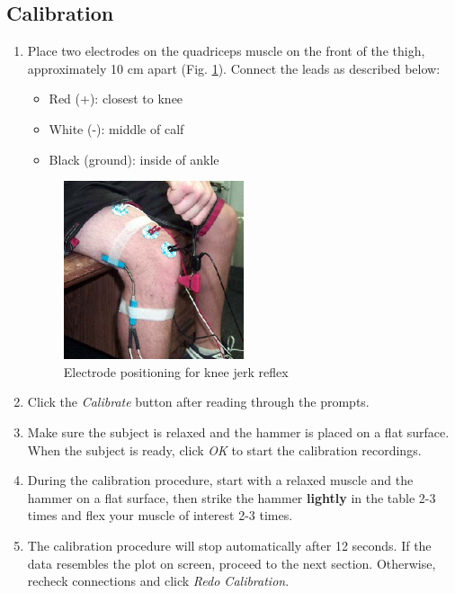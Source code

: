\documentclass{article}
\begin{document}
\subsection*{Calibration}
\begin{enumerate}
	\item Place two electrodes on the quadriceps muscle on the front of the thigh, approximately 10 cm apart (Fig. \ref{knee}). Connect the leads as described below:
		\begin{itemize}
			\item Red (+): closest to knee
			\item White (-): middle of calf
			\item Black (ground): inside of ankle
		\end{itemize}
		
		\begin{figure}[h]
		\centering
		\includegraphics[width=0.5\textwidth]{../images/EMG_II_7.jpg}	
		\caption{Electrode positioning for knee jerk reflex}
		\label{knee}
		\end{figure}

	\item Click the \textit{Calibrate} button after reading through the prompts.
	\item Make sure the subject is relaxed and the hammer is placed on a flat surface. When the subject is ready, click \textit{OK} to start the calibration recordings.
	\item During the calibration procedure, start with a relaxed muscle and the hammer on a flat surface, then strike the hammer \textbf{lightly} in the table 2-3 times and flex your muscle of interest 2-3 times.
	\item The calibration procedure will stop automatically after 12 seconds. If the data resembles the plot on screen, proceed to the next section. Otherwise, recheck connections and click \textit{Redo Calibration}.
\end{enumerate}
\end{document}
